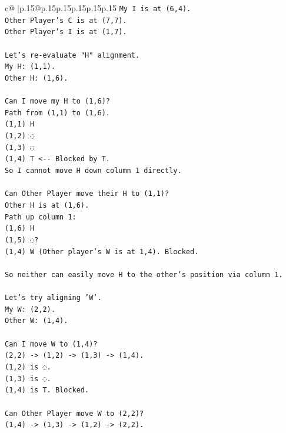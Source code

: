 \documentclass{article}
\begin{document}
{\begin{supertabular}{c@{$\;$}|p{.15\linewidth}@{}p{.15\linewidth}p{.15\linewidth}p{.15\linewidth}p{.15\linewidth}p{.15\linewidth}}
{{{\texttt{My I is at (6,4).} \\
\texttt{Other Player's C is at (7,7).} \\
\texttt{Other Player's I is at (1,7).} \\
\\ 
\texttt{Let's re{-}evaluate "H" alignment.} \\
\texttt{My H: (1,1).} \\
\texttt{Other H: (1,6).} \\
\\ 
\texttt{Can I move my H to (1,6)?} \\
\texttt{Path from (1,1) to (1,6).} \\
\texttt{(1,1) H} \\
\texttt{(1,2) ◌} \\
\texttt{(1,3) ◌} \\
\texttt{(1,4) T  <{-}{-} Blocked by T.} \\
\texttt{So I cannot move H down column 1 directly.} \\
\\ 
\texttt{Can Other Player move their H to (1,1)?} \\
\texttt{Other H is at (1,6).} \\
\texttt{Path up column 1:} \\
\texttt{(1,6) H} \\
\texttt{(1,5) ◌?} \\
\texttt{(1,4) W (Other player's W is at 1,4). Blocked.} \\
\\ 
\texttt{So neither can easily move H to the other's position via column 1.} \\
\\ 
\texttt{Let's try aligning 'W'.} \\
\texttt{My W: (2,2).} \\
\texttt{Other W: (1,4).} \\
\\ 
\texttt{Can I move W to (1,4)?} \\
\texttt{(2,2) {-}> (1,2) {-}> (1,3) {-}> (1,4).} \\
\texttt{(1,2) is ◌.} \\
\texttt{(1,3) is ◌.} \\
\texttt{(1,4) is T. Blocked.} \\
\\ 
\texttt{Can Other Player move W to (2,2)?} \\
\texttt{(1,4) {-}> (1,3) {-}> (1,2) {-}> (2,2).} \\
}}}
\end{supertabular}}
\end{document}

